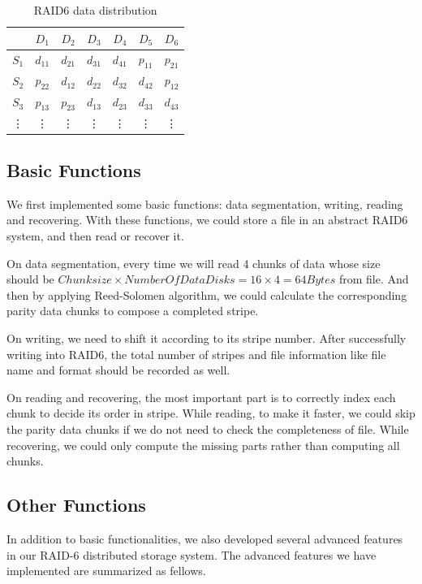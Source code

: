 \documentclass[journal]{IEEEtran}
\begin{document}
\begin{table}[ht]
\centering
\begin{tabular}{c|cccccc}

 		&  $D_1$ 	& $D_2$ 	& $D_3$ 	& $D_4$ 	& $D_5$ 	& $D_6$ 	\\
 		\hline
 $S_1$ 	&  $d_{11}$ & $d_{21}$ 	& $d_{31}$ 	& $d_{41}$ 	& $p_{11}$ 	& $p_{21}$ 	\\
 $S_2$ 	&  $p_{22}$	& $d_{12}$ 	& $d_{22}$ 	& $d_{32}$ 	& $d_{42}$ 	& $p_{12}$ 	 \\
 $S_3$ 	&  $p_{13}$ & $p_{23}$	& $d_{13}$ 	& $d_{23}$ 	& $d_{33}$ 	& $d_{43}$ 	\\
 \vdots &   \vdots & \vdots & \vdots & \vdots & \vdots & \vdots  	
\end{tabular}
\caption{RAID6 data distribution}
\end{table}

\subsection{Basic Functions}

We first implemented some basic functions: data segmentation, writing, reading and recovering. With these functions, we could store a file in an abstract RAID6 system, and then read or recover it.

On data segmentation, every time we will read 4 chunks of data whose size should be $Chunk size \times Number Of Data Disks = 16 \times 4 = 64 Bytes$ from file. And then by applying Reed-Solomen algorithm, we could calculate the corresponding parity data chunks to compose a completed stripe. 

On writing, we need to shift it according to its stripe number. After successfully writing into RAID6, the total number of stripes and file information like file name and format should be recorded as well.

On reading and recovering, the most important part is to correctly index each chunk to decide its order in stripe. While reading, to make it faster, we could skip the parity data chunks if we do not need to check the completeness of file. While recovering, we could only compute the missing parts rather than computing all chunks.

\subsection{Other Functions}
In addition to basic functionalities, we also developed several advanced features in our RAID-6 distributed storage system. The advanced features we have implemented are summarized as fellows.
\end{document}
